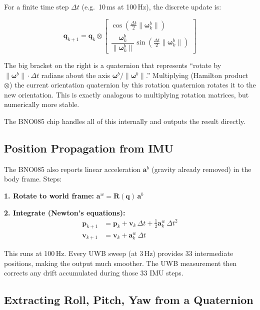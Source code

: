 \documentclass[11pt,a4paper]{article}
\newcommand{\vect}[1]{\bm{#1}}
\newcommand{\mat}[1]{\mathbf{#1}}
\begin{document}
For a finite time step $\Delta t$ (e.g.\ 10\,ms at 100\,Hz), the discrete update is:

\begin{equation}
\vect{q}_{k+1} = \vect{q}_k \otimes \begin{bmatrix}\cos\!\left(\tfrac{\Delta t}{2}\|\vect{\omega}^b_k\|\right) \\[3pt] \dfrac{\vect{\omega}^b_k}{\|\vect{\omega}^b_k\|}\sin\!\left(\tfrac{\Delta t}{2}\|\vect{\omega}^b_k\|\right)\end{bmatrix}
\label{eq:qprop}
\end{equation}

\begin{plain}
The big bracket on the right is a quaternion that represents ``rotate by $\|\vect{\omega}^b\| \cdot \Delta t$ radians about the axis $\vect{\omega}^b/\|\vect{\omega}^b\|$.'' Multiplying (Hamilton product $\otimes$) the current orientation quaternion by this rotation quaternion rotates it to the new orientation. This is exactly analogous to multiplying rotation matrices, but numerically more stable.

The BNO085 chip handles all of this internally and outputs the result directly.
\end{plain}

\subsection{Position Propagation from IMU}

The BNO085 also reports linear acceleration $\vect{a}^b$ (gravity already removed) in the body frame. Steps:

\textbf{1. Rotate to world frame:} $\vect{a}^w = \mat{R}(\vect{q})\,\vect{a}^b$

\textbf{2. Integrate (Newton's equations):}
\begin{align}
\vect{p}_{k+1} &= \vect{p}_k + \vect{v}_k\,\Delta t + \tfrac{1}{2}\vect{a}^w_k\,\Delta t^2 \\
\vect{v}_{k+1} &= \vect{v}_k + \vect{a}^w_k\,\Delta t
\end{align}

This runs at 100\,Hz. Every UWB sweep (at 3\,Hz) provides 33 intermediate positions, making the output much smoother. The UWB measurement then corrects any drift accumulated during those 33 IMU steps.

\subsection{Extracting Roll, Pitch, Yaw from a Quaternion}
\end{document}
